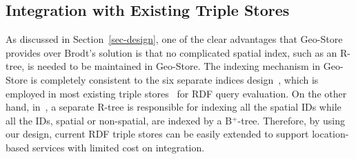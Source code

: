 







\subsection{Integration with Existing Triple Stores}

As discussed in Section~\ref{sec-design}, one of the clear
advantages that Geo-Store provides over Brodt's solution is that
no complicated spatial index, such as an R-tree, is needed to be
maintained in Geo-Store. The indexing mechanism in Geo-Store is
completely consistent to the six separate indices
design~\cite{journals/pvldb/WeissKB08}, which is employed in most
existing triple
stores~\cite{conf/www/CarrollDDRSW04,conf/vldb/AbadiMMH07,journals/pvldb/WeissKB08,journals/vldb/NeumannW10}
for RDF query evaluation. On the other hand,
in~\cite{conf/gis/BrodtNM10}, a separate R-tree is responsible for
indexing all the spatial IDs while all the IDs, spatial or
non-spatial, are indexed by a B$^{+}$-tree. Therefore, by using
our design, current RDF triple stores can be easily extended to
support location-based services with limited cost on integration.
